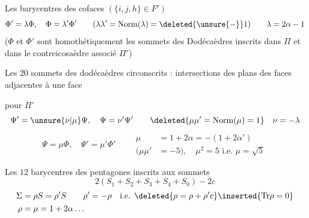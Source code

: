 Les  barycentres des cofaces $(\{i,j,h\}\in F')$
\[
\Phi'=\lambda\Phi,\quad\Phi=\lambda'\Phi'\qquad(\lambda\lambda'=\mathrm{Norm}(\lambda)=\deleted{\unsure{-}}1)\qquad\lambda=2\alpha-1
\]
($\Phi$ et $\Phi'$ sont homothétiquement les sommets des Dodécaèdres inscrits dans $\Pi$ et dans le contreicosaèdre associé $\Pi'$)

\margin{$\Psi$}
Les $20$ sommets  des dodécaèdres circonscrits  : intersections des plans des faces adjacentes à une face

 pour $\Pi'$
\[
\Psi'=\unsure{\nu|\mu}\Psi,\quad\Psi=\nu'\Psi'\qquad\deleted{\mu\mu'=\mathrm{Norm}(\mu)=1}\quad\nu=-\lambda
\]
\[
\boxed{\Psi=\mu\Phi,\quad\Psi'=\mu'\Phi'}
\qquad\begin{aligned}
\mu&=1+2\alpha=-(1+2\alpha')\\
(\mu\mu'&=-5),\quad\mu^2=5\text{ i.e. }\mu=\sqrt5
\end{aligned}
\]

\margin{$\Sigma$}
Les $12$  barycentres des pentagones inscrits aux sommets
\[
2(S_1+S_2+S_3+S_4+S_0)-2c
\]
\[
\begin{aligned}
\Sigma&=\rho S=\rho'S\qquad\rho'=-\rho\quad\text{i.e. }\deleted{\rho=\rho+\rho'c}\inserted{\mathrm{Tr}\rho=0}\\
\rho&=\mu=1+2\alpha\ldots
\end{aligned}
\]
